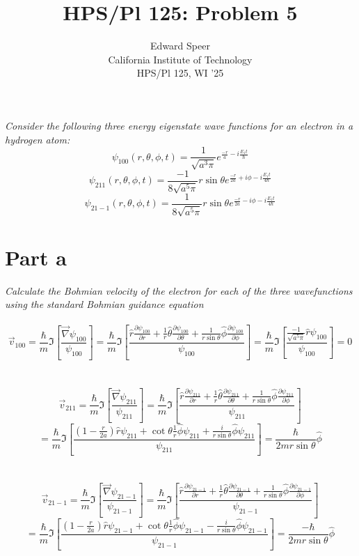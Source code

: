 \documentclass[11pt, a4paper]{article}
\title{HPS/Pl 125: Problem 5}
\author{%
  Edward Speer
  \\
  California Institute of Technology\\
  HPS/Pl 125, WI '25 \\
}
\date{\monthyeardate}
\begin{document}
\maketitle

\noindent \emph{Consider the following three energy eigenstate wave functions
for an electron in a hydrogen atom:
\[\psi_{100}(r, \theta, \phi, t) = \frac{1}{\sqrt{a^3\pi}}e^{\frac{-r}{a}-i\frac{E_1t}{\hbar}}\]
\[\psi_{211}(r, \theta, \phi, t) = \frac{-1}{8\sqrt{a^5\pi}}r\sin\theta e^{\frac{-r}{2a}+i\phi-i\frac{E_1t}{4\hbar}}\]
\[\psi_{21-1}(r, \theta, \phi, t) = \frac{1}{8\sqrt{a^5\pi}}r\sin\theta e^{\frac{-r}{2a}-i\phi-i\frac{E_1t}{4\hbar}}\]}

\section{Part a} \emph{Calculate the Bohmian velocity of the electron for each
of the three wavefunctions using the standard Bohmian guidance equation}
\\ \hfill \\
\[\overrightarrow{v}_{100} = \frac{\hbar}{m}\Im[\frac{\overrightarrow{\nabla}\psi_{100}}{\psi_{100}}] = \frac{\hbar}{m}\Im[\frac{\hat{r}\frac{\partial \psi_{100}}{\partial r} + \frac{1}{r}\hat{\theta}\frac{\partial \psi_{100}}{\partial\theta} + \frac{1}{r\sin\theta}\hat{\phi}\frac{\partial \psi_{100}}{\partial \phi}}{\psi_{100}}] = \frac{\hbar}{m}\Im[\frac{\frac{-1}{\sqrt{a^5\pi}}\hat{r}\psi_{100}}{\psi_{100}}] = \boxed{0}\]
\\ \hfill \\
\[\overrightarrow{v}_{211} = \frac{\hbar}{m}\Im[\frac{\overrightarrow{\nabla}\psi_{211}}{\psi_{211}}] = \frac{\hbar}{m}\Im[\frac{\hat{r}\frac{\partial \psi_{211}}{\partial r} + \frac{1}{r}\hat{\theta}\frac{\partial \psi_{211}}{\partial\theta} + \frac{1}{r\sin\theta}\hat{\phi}\frac{\partial \psi_{211}}{\partial \phi}}{\psi_{211}}]\]
\[= \frac{\hbar}{m}\Im[\frac{(1 - \frac{r}{2a})\hat{r}\psi_{211}+\cot\theta\frac{1}{r}\hat{\phi}\psi_{211} + \frac{i}{r\sin\theta}\hat{\phi}\psi_{211}}{\psi_{211}}] = \boxed{\frac{\hbar}{2mr\sin\theta}\hat{\phi}}\]
\\ \hfill \\
\[\overrightarrow{v}_{21-1} = \frac{\hbar}{m}\Im[\frac{\overrightarrow{\nabla}\psi_{21-1}}{\psi_{21-1}}] = \frac{\hbar}{m}\Im[\frac{\hat{r}\frac{\partial \psi_{21-1}}{\partial r} + \frac{1}{r}\hat{\theta}\frac{\partial \psi_{21-1}}{\partial\theta} + \frac{1}{r\sin\theta}\hat{\phi}\frac{\partial \psi_{21-1}}{\partial \phi}}{\psi_{21-1}}]\]
\[= \frac{\hbar}{m}\Im[\frac{(1 - \frac{r}{2a})\hat{r}\psi_{21-1}+\cot\theta\frac{1}{r}\hat{\phi}\psi_{21-1} - \frac{i}{r\sin\theta}\hat{\phi}\psi_{21-1}}{\psi_{21-1}}] = \boxed{\frac{-\hbar}{2mr\sin\theta}\hat{\phi}}\]
\end{document}
